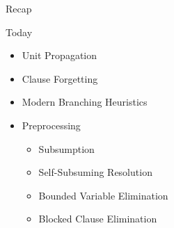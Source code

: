 \documentclass[t]{sdqbeamer}
\begin{document}
\begin{frame}{Recap}
    \begin{block}{Today}
        \begin{itemize}\setlength{\itemsep}{1em}
            \item Unit Propagation
            \item Clause Forgetting
            \item Modern Branching Heuristics
            \item Preprocessing
            \begin{itemize}\setlength{\itemsep}{1ex}
                \item Subsumption
                \item Self-Subsuming Resolution
                \item Bounded Variable Elimination
                \item Blocked Clause Elimination
            \end{itemize}
        \end{itemize}
    \end{block}
\end{frame}


    
    
    
\end{document}
